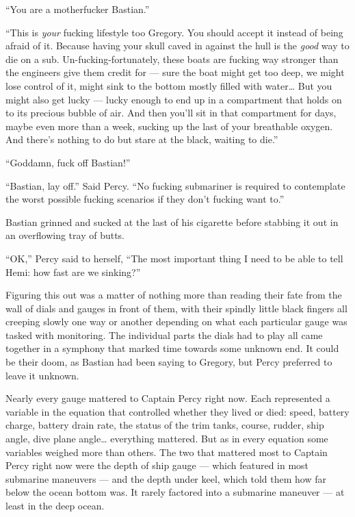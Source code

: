 \documentclass[]{article}
\begin{document}
\begin{multicols}{2}
``You are a motherfucker Bastian.''

``This is \emph{your} fucking lifestyle too Gregory. You should accept
it instead of being afraid of it. Because having your skull caved in
against the hull is the \emph{good} way to die on a sub.
Un-fucking-fortunately, these boats are fucking way stronger than the
engineers give them credit for --- sure the boat might get too deep, we
might lose control of it, might sink to the bottom mostly filled with
water\ldots{} But you might also get lucky --- lucky enough to end up in
a compartment that holds on to its precious bubble of air. And then
you'll sit in that compartment for days, maybe even more than a week,
sucking up the last of your breathable oxygen. And there's nothing to do
but stare at the black, waiting to die.''

``Goddamn, fuck off Bastian!''

``Bastian, lay off.'' Said Percy. ``No fucking submariner is required to
contemplate the worst possible fucking scenarios if they don't fucking
want to.''

Bastian grinned and sucked at the last of his cigarette before stabbing
it out in an overflowing tray of butts.

``OK,'' Percy said to herself, ``The most important thing I need to be
able to tell Hemi: how fast are we sinking?''

Figuring this out was a matter of nothing more than reading their fate
from the wall of dials and gauges in front of them, with their spindly
little black fingers all creeping slowly one way or another depending on
what each particular gauge was tasked with monitoring. The individual
parts the dials had to play all came together in a symphony that marked
time towards some unknown end. It could be their doom, as Bastian had
been saying to Gregory, but Percy preferred to leave it unknown.

Nearly every gauge mattered to Captain Percy right now. Each represented
a variable in the equation that controlled whether they lived or died:
speed, battery charge, battery drain rate, the status of the trim tanks,
course, rudder, ship angle, dive plane angle\ldots{} everything
mattered. But as in every equation some variables weighed more than
others. The two that mattered most to Captain Percy right now were the
depth of ship gauge --- which featured in most submarine maneuvers ---
and the depth under keel, which told them how far below the ocean bottom
was. It rarely factored into a submarine maneuver --- at least in the
deep ocean.


\end{multicols}
\end{document}
